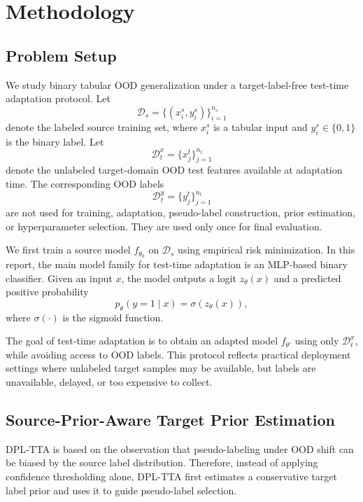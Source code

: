 
\section{Methodology}

\subsection{Problem Setup}

We study binary tabular OOD generalization under a target-label-free test-time adaptation protocol. Let
\[
\mathcal{D}_s = \{(x_i^s, y_i^s)\}_{i=1}^{n_s}
\]
denote the labeled source training set, where $x_i^s$ is a tabular input and $y_i^s \in \{0,1\}$ is the binary label. Let
\[
\mathcal{D}_t^x = \{x_j^t\}_{j=1}^{n_t}
\]
denote the unlabeled target-domain OOD test features available at adaptation time. The corresponding OOD labels
\[
\mathcal{D}_t^y = \{y_j^t\}_{j=1}^{n_t}
\]
are not used for training, adaptation, pseudo-label construction, prior estimation, or hyperparameter selection. They are used only once for final evaluation.

We first train a source model $f_{\theta_0}$ on $\mathcal{D}_s$ using empirical risk minimization. In this report, the main model family for test-time adaptation is an MLP-based binary classifier. Given an input $x$, the model outputs a logit $z_\theta(x)$ and a predicted positive probability
\[
p_\theta(y=1 \mid x) = \sigma(z_\theta(x)),
\]
where $\sigma(\cdot)$ is the sigmoid function.

The goal of test-time adaptation is to obtain an adapted model $f_{\theta'}$ using only $\mathcal{D}_t^x$, while avoiding access to OOD labels. This protocol reflects practical deployment settings where unlabeled target samples may be available, but labels are unavailable, delayed, or too expensive to collect.

\subsection{Source-Prior-Aware Target Prior Estimation}

DPL-TTA is based on the observation that pseudo-labeling under OOD shift can be biased by the source label distribution. Therefore, instead of applying confidence thresholding alone, DPL-TTA first estimates a conservative target label prior and uses it to guide pseudo-label selection.

